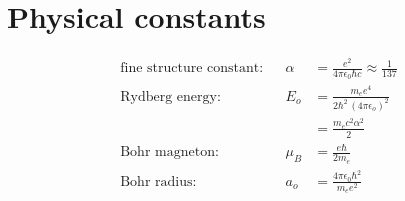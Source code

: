 \documentclass[10pt,twocolumn]{article}
\date{April 2, 2007}
\newcommand{\sigaussian}[2]{#1} %
\newcommand{\fourpiepsilono}{\sigaussian{4\pi\epsilon_0}{}}
\begin{document}
  \section{Physical constants}
  \begin{align*}
    \text{fine structure constant}:  &&\alpha &= \frac{e^2}{\fourpiepsilono
    \hbar c} \approx \frac{1}{137}\\
    \text{Rydberg energy}:  &&E_o &= \frac{m_e e^4}{2\hbar^2 \,\sigaussian{(4\pi\epsilon_o)^2}{}}\\
    && &= \frac{m_ec^2\alpha^2}2 \\
    \text{Bohr magneton}:  &&\mu_B &= \frac{e\hbar}{2m_e\sigaussian{}{c}} \\
    \text{Bohr radius}:  &&a_o &= \frac{\fourpiepsilono\hbar^2}{m_e e^2}
  \end{align*}
\end{document}
